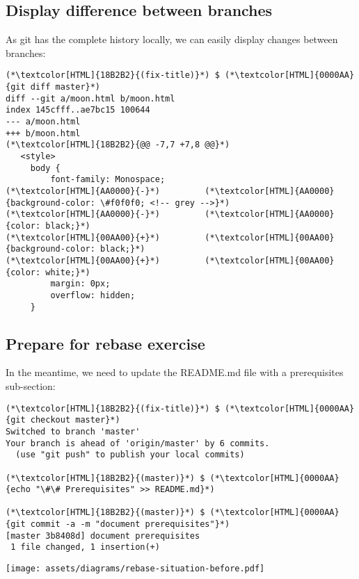 \subsection{Display difference between branches}
\begin{frame}[fragile]
  \subslidetitle

  As git has the complete history locally, we can easily display changes between branches:

  \begin{lstlisting}
(*\textcolor[HTML]{18B2B2}{(fix-title)}*) $ (*\textcolor[HTML]{0000AA}{git diff master}*)
diff --git a/moon.html b/moon.html
index 145cfff..ae7bc15 100644
--- a/moon.html
+++ b/moon.html
(*\textcolor[HTML]{18B2B2}{@@ -7,7 +7,8 @@}*)
   <style>
     body {
         font-family: Monospace;
(*\textcolor[HTML]{AA0000}{-}*)         (*\textcolor[HTML]{AA0000}{background-color: \#f0f0f0; <!-- grey -->}*)
(*\textcolor[HTML]{AA0000}{-}*)         (*\textcolor[HTML]{AA0000}{color: black;}*)
(*\textcolor[HTML]{00AA00}{+}*)         (*\textcolor[HTML]{00AA00}{background-color: black;}*)
(*\textcolor[HTML]{00AA00}{+}*)         (*\textcolor[HTML]{00AA00}{color: white;}*)
         margin: 0px;
         overflow: hidden;
     }
\end{lstlisting}
\end{frame}

\subsection{Prepare for rebase exercise}
\begin{frame}[fragile]
  \subslidetitle

  In the meantime, we need to update the README.md file with a prerequisites sub-section:
  \begin{lstlisting}
(*\textcolor[HTML]{18B2B2}{(fix-title)}*) $ (*\textcolor[HTML]{0000AA}{git checkout master}*)
Switched to branch 'master'
Your branch is ahead of 'origin/master' by 6 commits.
  (use "git push" to publish your local commits)

(*\textcolor[HTML]{18B2B2}{(master)}*) $ (*\textcolor[HTML]{0000AA}{echo "\#\# Prerequisites" >> README.md}*)

(*\textcolor[HTML]{18B2B2}{(master)}*) $ (*\textcolor[HTML]{0000AA}{git commit -a -m "document prerequisites"}*)
[master 3b8408d] document prerequisites
 1 file changed, 1 insertion(+)
\end{lstlisting}

  \centerline{\texttt{[image: assets/diagrams/rebase-situation-before.pdf]}}

\end{frame}


